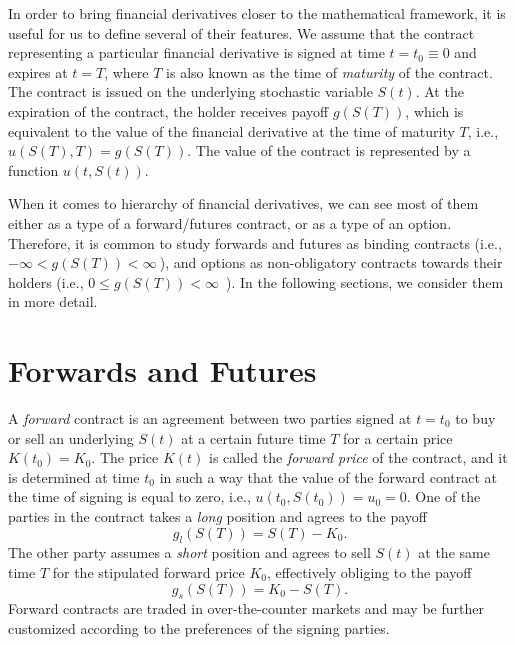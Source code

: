 \documentclass{UUThesisTemplate}
\begin{document}
\par
In order to bring financial derivatives closer to the mathematical framework, it is useful for us to define several of their features. We assume that the contract representing a particular financial derivative is signed at time $t=t_0\equiv0$ and expires at $t=T$, where $T$ is also known as the time of \emph{maturity} of the contract. The contract is issued on the underlying stochastic variable $S(t)$. At the expiration of the contract, the holder receives payoff $g(S(T))$, which is equivalent to the value of the financial derivative at the time of maturity $T$, i.e., $u(S(T),T) = g(S(T))$. The value of the contract is represented by a function $u(t,S(t))$.

\par
When it comes to hierarchy of financial derivatives, we can see most of them either as a type of a forward/futures contract, or as a type of an option. Therefore, it is common to study forwards and futures as binding contracts (i.e., $-\infty < g(S(T)) < \infty\ $), and options as non-obligatory contracts towards their holders (i.e., $0\leq g(S(T))<\infty$\ ). In the following sections, we consider them in more detail.
%





%
\section{Forwards and Futures}
\label{sec:futures}

\par
A \emph{forward} contract is an agreement between two parties signed at $t=t_0$ to buy or sell an underlying $S(t)$ at a certain future time $T$ for a certain price $K(t_0)=K_0$. The price $K(t)$ is called the \emph{forward price} of the contract, and it is determined at time $t_0$ in such a way that the value of the forward contract at the time of signing is equal to zero, i.e., $u(t_0,S(t_0))=u_0=0$. One of the parties in the contract takes a \emph{long} position and agrees to the payoff 
$$g_l(S(T))=S(T)-K_0.$$
The other party assumes a \emph{short} position and agrees to sell $S(t)$ at the same time $T$ for the stipulated forward price $K_0$, effectively obliging to the payoff 
$$g_s(S(T))=K_0-S(T).$$
Forward contracts are traded in over-the-counter markets and may be further customized according to the preferences of the signing parties.
\end{document}
